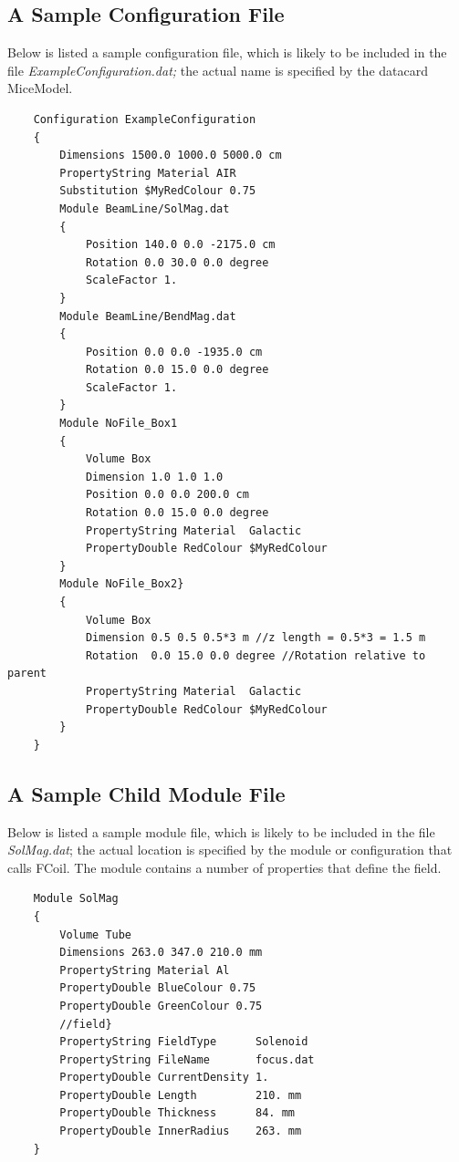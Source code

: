 \subsection{A Sample Configuration File}
Below is listed a sample configuration file, which is likely to be included in the file
\textit{ExampleConfiguration.dat;} the actual name is specified by the datacard MiceModel.
\begin{verbatim}
    Configuration ExampleConfiguration
    {
        Dimensions 1500.0 1000.0 5000.0 cm
        PropertyString Material AIR
        Substitution $MyRedColour 0.75
        Module BeamLine/SolMag.dat
        {
            Position 140.0 0.0 -2175.0 cm
            Rotation 0.0 30.0 0.0 degree
            ScaleFactor 1.
        }
        Module BeamLine/BendMag.dat
        {
            Position 0.0 0.0 -1935.0 cm
            Rotation 0.0 15.0 0.0 degree
            ScaleFactor 1.
        }
        Module NoFile_Box1
        {
            Volume Box
            Dimension 1.0 1.0 1.0
            Position 0.0 0.0 200.0 cm
            Rotation 0.0 15.0 0.0 degree
            PropertyString Material  Galactic
            PropertyDouble RedColour $MyRedColour
        }
        Module NoFile_Box2}
        {
            Volume Box
            Dimension 0.5 0.5 0.5*3 m //z length = 0.5*3 = 1.5 m
            Rotation  0.0 15.0 0.0 degree //Rotation relative to parent
            PropertyString Material  Galactic
            PropertyDouble RedColour $MyRedColour
        }
    }
\end{verbatim}

\subsection{A Sample Child Module File}
Below is listed a sample module file, which is likely to be included in the file \textit{SolMag.dat}; the actual
location is specified by the module or configuration that calls FCoil. The module contains a number of properties that
define the field.

\begin{verbatim}
    Module SolMag
    {
        Volume Tube
        Dimensions 263.0 347.0 210.0 mm
        PropertyString Material Al
        PropertyDouble BlueColour 0.75
        PropertyDouble GreenColour 0.75
        //field}
        PropertyString FieldType      Solenoid
        PropertyString FileName       focus.dat
        PropertyDouble CurrentDensity 1.
        PropertyDouble Length         210. mm
        PropertyDouble Thickness      84. mm
        PropertyDouble InnerRadius    263. mm
    }
\end{verbatim}

